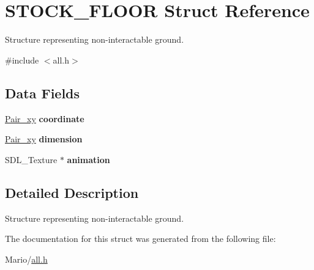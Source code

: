 \hypertarget{struct_s_t_o_c_k___f_l_o_o_r}{}\section{S\+T\+O\+C\+K\+\_\+\+F\+L\+O\+OR Struct Reference}
\label{struct_s_t_o_c_k___f_l_o_o_r}


Structure representing non-\/interactable ground.  




{\ttfamily \#include $<$all.\+h$>$}

\subsection*{Data Fields}
\begin{DoxyCompactItemize}
\item 
\mbox{\label{struct_s_t_o_c_k___f_l_o_o_r_a6cf77a9254df5cfd669084e0a97d9711}} 
\mbox{\hyperlink{all_8h_a9a35f73dcc6cf9a466e6542847bd8882}{Pair\+\_\+xy}} {\bfseries coordinate}
\item 
\mbox{\label{struct_s_t_o_c_k___f_l_o_o_r_a0da7d680eb31a67eac3371518ae0a6cb}} 
\mbox{\hyperlink{all_8h_a9a35f73dcc6cf9a466e6542847bd8882}{Pair\+\_\+xy}} {\bfseries dimension}
\item 
\mbox{\label{struct_s_t_o_c_k___f_l_o_o_r_a15c618ec6bff31ac32dba21208442152}} 
S\+D\+L\+\_\+\+Texture $\ast$ {\bfseries animation}
\end{DoxyCompactItemize}


\subsection{Detailed Description}
Structure representing non-\/interactable ground. 

The documentation for this struct was generated from the following file\+:\begin{DoxyCompactItemize}
\item 
Mario/\mbox{\hyperlink{all_8h}{all.\+h}}\end{DoxyCompactItemize}
